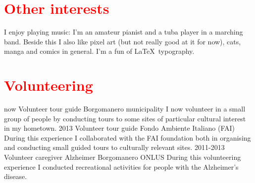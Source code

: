 \documentclass[a4paper]{friggeri-cv}
\begin{document}
\section{\textcolor{red}{Other interests}}
I enjoy playing music: I'm an amateur pianist and a tuba player in a marching band. Beside this I also like pixel art (but not really good at it for now), cats, manga and comics in general. I'm a fun of \LaTeX\ typography.
\section{\textcolor{red}{Volunteering}}
\begin{entrylist}
	\entry
	{now}
	{Volunteer tour guide}
	{Borgomanero municipality}
	{I now volunteer in a small group of people by conducting tours to some sites of particular cultural interest in my hometown.}
	\entry
	{2013}
	{Volunteer tour guide}
	{Fondo Ambiente Italiano (FAI)}
	{During this experience I collaborated with the FAI foundation both in organising and conducting small guided tours to culturally relevant sites.}
	\entry
	{2011-2013}
	{Volunteer caregiver}
	{Alzheimer Borgomanero ONLUS}
	{During this volunteering experience I conducted recreational activities for people with the Alzheimer's disease.}
\end{entrylist}
\end{document}
